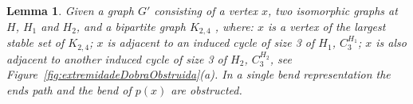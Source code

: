 \documentclass[a4paper,11pt]{article}
\newtheorem{lema}[theorem]{Lemma}
\begin{document}


%

%


%



\begin{lema}\label{lem:obstrucao}
Given a graph $ G'$ consisting of a vertex $ x $, two isomorphic graphs at $ H $, $ H_1 $ and $ H_2 $, and a bipartite graph $ K_{2,4} $ , where: $ x $ is a vertex of the largest stable set of $ K_{2,4} $; $x $ is adjacent to an induced cycle of size 3 of $ H_1 $, $ C_3^{H_1} $; $x $ is also adjacent to another induced cycle of size 3 of $ H_2 $, $ C_3^{H_2}$, see Figure~\ref{fig:extremidadeDobraObstruida}(a). In a single bend representation the ends path and the bend of $p(x) $ are obstructed.%
\end{lema}
\end{document}
